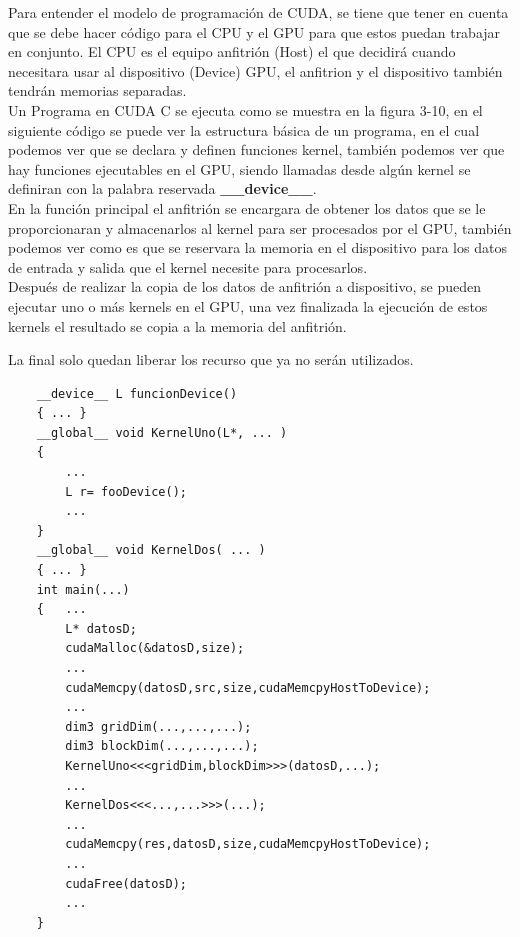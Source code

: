 Para entender el modelo de programación de CUDA, se tiene que tener en cuenta que se debe hacer código para el CPU y el GPU para que estos puedan trabajar en conjunto. El CPU es el equipo anfitrión (Host) el que decidirá cuando necesitara usar al dispositivo (Device) GPU, el anfitrion y el dispositivo también tendrán memorias separadas. 
\\
Un Programa en CUDA C se ejecuta como se muestra en la figura 3-10, en el siguiente código se puede ver la estructura básica de un programa, en el cual podemos ver que se declara y definen funciones kernel, también podemos ver que hay funciones ejecutables en el GPU, siendo llamadas desde algún kernel se definiran con la palabra reservada \textbf{\_\_device\_\_}.
\\
En la función principal el anfitrión se encargara de obtener los datos que se le proporcionaran y almacenarlos al kernel para ser procesados por el  GPU, también podemos ver como es que se reservara la memoria en el dispositivo para los datos de entrada y salida que el kernel necesite para procesarlos.
\\
Después de realizar la copia de los datos de anfitrión a dispositivo, se pueden ejecutar uno o más kernels en el GPU, una vez finalizada la ejecución de estos kernels el resultado se copia a la memoria del anfitrión. 
\pagebreak

La final solo quedan liberar los recurso que ya no serán utilizados. 

\begin{lstlisting}
	__device__ L funcionDevice()
	{ ... }	
	__global__ void KernelUno(L*, ... )
    {
    	...
   		L r= fooDevice();
   		...
    }
    __global__ void KernelDos( ... )
    { ... }    
    int main(...)
	{	...
		L* datosD;
		cudaMalloc(&datosD,size);
		...		
		cudaMemcpy(datosD,src,size,cudaMemcpyHostToDevice);		
		...	
		dim3 gridDim(...,...,...);
		dim3 blockDim(...,...,...);
		KernelUno<<<gridDim,blockDim>>>(datosD,...);	
		...
		KernelDos<<<...,...>>>(...);
		...
		cudaMemcpy(res,datosD,size,cudaMemcpyHostToDevice);
		...
		cudaFree(datosD);
		...			
	}
\end{lstlisting}




  







